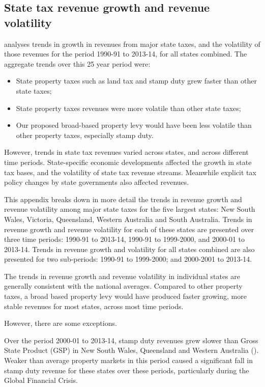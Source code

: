 \documentclass[twoside,english]{Dianab5ona4portrait}
\begin{document}
\begin{subappendices}
\chapter{State tax revenue growth and revenue volatility\label{appendix:PROP}}
 analyses trends in growth in revenues from major state taxes, and the volatility of those revenues for the period 1990-91 to 2013-14, for all states combined. The aggregate trends over this 25 year period were:

\begin{itemize}
\item	State property taxes such as land tax and stamp duty grew faster than other state taxes;
\item	State property taxes revenues were more volatile than other state taxes;
\item	Our proposed broad-based property levy would have been less volatile than other property taxes, especially stamp duty.
\end{itemize}

However, trends in state tax revenues varied across states, and across different time periods. State-specific economic developments affected the growth in state tax bases, and the volatility of state tax revenue streams. Meanwhile explicit tax policy changes by state governments also affected revenues.

This appendix breaks down in more detail the trends in revenue growth and revenue volatility among major state taxes for the five largest states: New South Wales, Victoria, Queensland, Western Australia and South Australia. Trends in revenue growth and revenue volatility for each of these states are presented over three time periods: 1990-91 to 2013-14, 1990-91 to 1999-2000, and 2000-01 to 2013-14. Trends in revenue growth and volatility for all states combined are also presented for two sub-periods: 1990-91 to 1999-2000; and 2000-2001 to 2013-14.

The trends in revenue growth and revenue volatility in individual states are generally consistent with the national averages. Compared to other property taxes, a broad based property levy would have produced faster growing, more stable revenues for most states, across most time periods.

However, there are some exceptions.  

Over the period 2000-01 to 2013-14, stamp duty revenues grew slower than Gross State Product (GSP) in New South Wales, Queensland and Western Australia (). Weaker than average property markets in this period caused a significant fall in stamp duty revenue for these states over these periods, particularly during the Global Financial Crisis. 


\end{subappendices}
\end{document}
